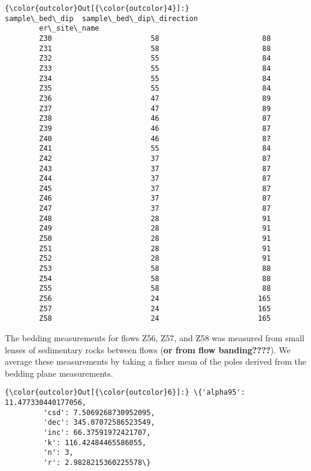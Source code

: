 \documentclass[11pt]{article}
\begin{document}
            \begin{Verbatim}[commandchars=\\\{\}]
{\color{outcolor}Out[{\color{outcolor}4}]:}               sample\_bed\_dip  sample\_bed\_dip\_direction
        er\_site\_name                                          
        Z30                       58                        88
        Z31                       58                        88
        Z32                       55                        84
        Z33                       55                        84
        Z34                       55                        84
        Z35                       55                        84
        Z36                       47                        89
        Z37                       47                        89
        Z38                       46                        87
        Z39                       46                        87
        Z40                       46                        87
        Z41                       55                        84
        Z42                       37                        87
        Z43                       37                        87
        Z44                       37                        87
        Z45                       37                        87
        Z46                       37                        87
        Z47                       37                        87
        Z48                       28                        91
        Z49                       28                        91
        Z50                       28                        91
        Z51                       28                        91
        Z52                       28                        91
        Z53                       58                        88
        Z54                       58                        88
        Z55                       58                        88
        Z56                       24                       165
        Z57                       24                       165
        Z58                       24                       165
\end{Verbatim}
        
    The bedding measurements for flows Z56, Z57, and Z58 was measured from
small lenses of sedimentary rocks between flows (\textbf{or from flow
banding????}). We average these measurements by taking a fisher mean of
the poles derived from the bedding plane measurements.



            \begin{Verbatim}[commandchars=\\\{\}]
{\color{outcolor}Out[{\color{outcolor}6}]:} \{'alpha95': 11.477330440177056,
         'csd': 7.5069268730952095,
         'dec': 345.07072586523549,
         'inc': 66.37591972421707,
         'k': 116.42484465586055,
         'n': 3,
         'r': 2.9828215360225578\}
\end{Verbatim}
        
\end{document}
